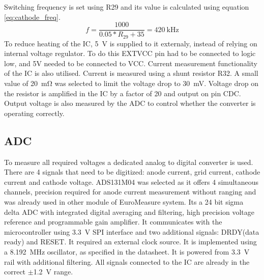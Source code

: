 \documentclass{article}
\begin{document}
Switching frequency is set using R29 and its value is calculated using equation \ref{eq:cathode_freq}.
\begin{equation}
	f = \frac{1000}{0.05*R_{29}+35} = \SI{420}{\kilo\hertz}
	\label{eq:cathode_freq}
\end{equation}
To reduce heating of the IC, \SI{5}{\volt} is supplied to it externaly, instead of relying on internal voltage regulator. To do this EXTVCC pin had to be connected to logic low, and 5V needed to be connected to VCC.
Current measurement functionality of the IC is also utilised. Current is measured using a shunt resistor R32. A small value of \SI{20}{\milli\ohm} was selected to limit the voltage drop to \SI{30}{\milli\volt}.
Voltage drop on the resistor is amplified in the IC by a factor of 20 and output on pin CDC. Output voltage is also measured by the ADC to control whether the converter is operating correctly.


\subsection{ADC}
To measure all required voltages a dedicated analog to digital converter is used. There are 4 signals that need to be digitized: anode current, grid current, cathode current and cathode voltage.
ADS131M04 was selected as it offers 4 simultaneous channels, precision required for anode current measurement without ranging and was already used in other module of EuroMeasure system.
Its a 24 bit sigma delta ADC with integrated digital averaging and filtering, high precision voltage reference and programmable gain amplifier.
It communicates with the microcontroller using \SI{3.3}{\volt} SPI interface and two additional signals: DRDY(data ready) and RESET.
It required an external clock source. It is implemented using a \SI{8.192}{\mega\hertz} oscillator, as specified in the datasheet.
It is powered from \SI{3.3}{\volt} rail with additional filtering.
All signals connected to the IC are already in the correct $\pm$\SI{1.2}{\volt} range.


\end{document}
